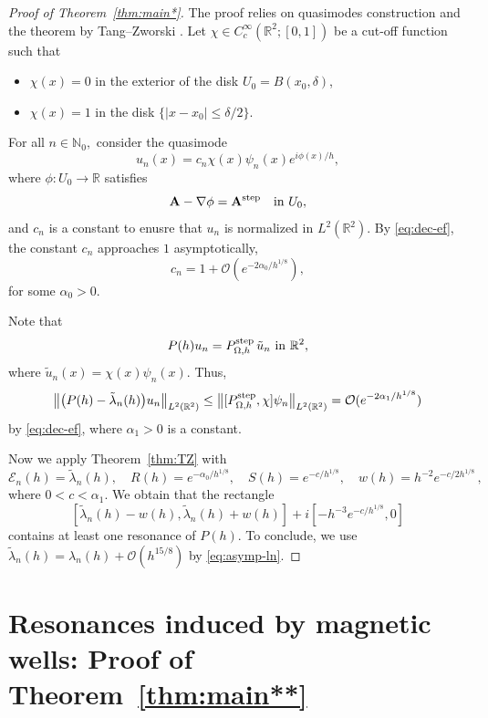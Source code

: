 \documentclass[11pt]{amsart}
\theoremstyle{remark}
\newcommand{\bA}{\mathbf{A}}
\newcommand{\R}{\mathbb{R}}
\numberwithin{equation}{section}
\begin{document}
\begin{proof}[Proof of Theorem~\ref{thm:main*}]
The proof relies on quasimodes construction and the theorem by Tang--Zworski \cite{TZ}. Let 
$\chi\in C_c^\infty(\R^2;[0,1])$ be a cut-off function such that
\begin{itemize}
    \item $\chi(x)=0$ in the exterior of the disk $U_0=B(x_0,\delta)$,
    \item $\chi(x)=1$ in the disk $\{|x-x_0|\leq \delta/2\}$.
\end{itemize}
For all $n\in\mathbb N_0,$ consider the quasimode
\[u_n(x)=c_n\chi(x)\psi_n(x)e^{i\phi(x)/h},\]
where $\phi:U_0\to \mathbb R$ satisfies
\[\bA-\nabla\phi=\bA^{\rm step}\quad\mbox{in }U_0,\]
and $c_n$ is a constant to enusre that $u_n$ is normalized in $L^2(\R^2)$. By \eqref{eq:dec-ef}, the constant $c_n$ approaches $1$ asymptotically,
\[c_n=1+\mathcal O(e^{-2\alpha_0/ h^{1/8}}),\]
for some $\alpha_0>0$.

Note that
\[P(h)u_n=P^{\rm step}_{\Omega,h}\,\tilde u_n \mbox{ in }\R^2,\]
where $\tilde u_n(x)=\chi(x)\psi_n(x).$ Thus,
\[\bigl\|\bigl(P(h)-\tilde\lambda_n(h)\bigr)u_n\bigr\|_{L^2(\R^2)}\leq \bigl\|[P_{\Omega,h}^{\rm step},\chi]\psi_n\bigr\|_{L^2(\R^2)}=\mathcal O(e^{-2\alpha_1/h^{1/8}})\]
by \eqref{eq:dec-ef}, where $\alpha_1>0$ is a constant.

Now we apply Theorem~\ref{thm:TZ} with 
\[\mathcal E_n(h)=\tilde \lambda_n(h),\quad R(h)=e^{-\alpha_0/h^{1/8}},\quad S(h)=e^{-c/h^{1/8}},\quad w(h)=h^{-2}e^{-c/2h^{1/8}}\,,\]
where $0<c<\alpha_1$. We obtain that the rectangle
\[[\tilde\lambda_n(h) - w(h), \tilde\lambda_n(h) + w(h)] + i[-h^{-3}e^{-c/h^{1/8}}, 0]
\]
contains at least one resonance of $P(h)$.
To conclude, we use   $\tilde\lambda_n(h)=\lambda_n(h)+\mathcal O(h^{15/8})$ by \eqref{eq:asymp-ln}.
\end{proof}

\section{Resonances induced by magnetic wells: Proof of Theorem~\ref{thm:main**}}\label{sec:m-well}
\end{document}

